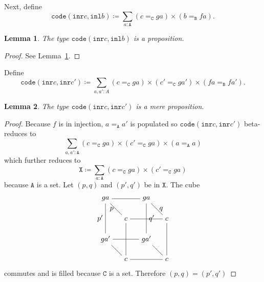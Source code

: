 \documentclass[12pt]{amsart}
\newcommand{\bydef}{\coloneqq}
\newcommand{\type}[1]{\mathtt{#1}}
\newcommand{\tin}{\colon}
\newcommand{\A}{\type{A}}
\newcommand{\B}{\type{B}}
\newcommand{\C}{\type{C}}
\newcommand{\inl}{\type{inl}}
\newcommand{\inr}{\type{inr}}
\newcommand{\code}{\type{code}}
\newtheorem{lemma}{Lemma}
\theoremstyle{remark}
\theoremstyle{definition}
\begin{document}
Next, define
\[
  \code ( \inr c , \inl b ) \bydef
  \sum_{ a : \A } ( c =_\C ga ) \times ( b =_\B fa ).
\]

\begin{lemma} \label{thm:code-cb-isProp}
%
  The type \( \code ( \inr c , \inl b ) \) is a proposition.
%
\end{lemma}
\begin{proof}
%
  See Lemma~\ref{thm:code-cb-isProp}.   
%
\end{proof}

Define
\[
  \code ( \inr c , \inr c' ) \bydef \sum_{ a , a' : A }
  ( c =_\C ga ) \times ( c' =_\C ga' ) \times ( fa =_\B fa' ).
\]

\begin{lemma} \label{sec:code-cc-isProp}
%
  The type \( \code ( \inr c , \inr c' ) \) is a mere proposition.
%
\end{lemma}
\begin{proof}
%
  Because \( f \) is in injection, \( a =_\A a' \) is populated so
  \(
      \code ( \inr c , \inr c' )
  \)
   beta-reduces to
  \[
    \sum\limits_{a,a' \tin \A}
    ( c =_\C ga ) \times ( c' =_\C ga ) \times ( a =_\A a )
  \]
  which further reduces to 
  \[
    \type{X} \bydef
    \sum\limits_{a \tin \A} ( c =_\C ga ) \times ( c' =_\C ga )
  \]
  because \( \A \) is a set. Let \( (p,q) \) and \( ( p',q' ) \) be in
  \( \type{X} \). The cube
  \[
      \begin{tikzpicture}
        \node (1) at (0,2) {\( ga \)};
        \node (2) at (2,2) {\( ga\)};
        \node (3) at (1,1) {\( c \)};
        \node (4) at (3,1) {\( c \)};
        \node (5) at (0,0) {\( ga' \)};
        \node (6) at (2,0) {\( ga' \)};
        \node (7) at (1,-1) {\( c \)};
        \node (8) at (3,-1) {\( c \)};
        \draw [-] (1) to node [] {} (2);
        \draw [-] (3) to node [] {} (4);
        \draw [-] (5) to node [] {} (6);
        \draw [-] (7) to node [] {} (8);
        \draw [-] (1) to node [left] {\( p \)} (3);
        \draw [-] (2) to node [right] {\( q \)} (4);
        \draw [-] (5) to node [] {} (7);
        \draw [-] (6) to node [] {} (8);
        \draw [-] (1) to node [left] {\( p' \)} (5);
        \draw [-] (2) to node [right] {\( q' \)} (6);
        \draw [-] (3) to node [] {} (7);
        \draw [-] (4) to node [] {} (8); 
      \end{tikzpicture}
    \]
    commutes and is filled because \( \C \) is a set. Therefore
    \(
         ( p,q ) = ( p',q' ) 
    \)
%
\end{proof}
\end{document}
